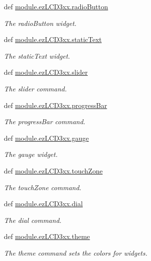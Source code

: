 \begin{DoxyCompactItemize}
def \hyperlink{group___widgets_gaef2c149d7df7f92b718a8660fd0db245}{module.\-ez\-L\-C\-D3xx.\-radio\-Button}
\begin{DoxyCompactList}\small\item\em The radio\-Button widget. \end{DoxyCompactList}\item 
def \hyperlink{group___widgets_gacee37e549f8a877a715b68d39460f7b7}{module.\-ez\-L\-C\-D3xx.\-static\-Text}
\begin{DoxyCompactList}\small\item\em The static\-Text widget. \end{DoxyCompactList}\item 
def \hyperlink{group___widgets_ga93ee96540f5ffc5c4704f60592074d80}{module.\-ez\-L\-C\-D3xx.\-slider}
\begin{DoxyCompactList}\small\item\em The slider command. \end{DoxyCompactList}\item 
def \hyperlink{group___widgets_ga9eeb62ec0060e5ba57e42986b2d555ae}{module.\-ez\-L\-C\-D3xx.\-progress\-Bar}
\begin{DoxyCompactList}\small\item\em The progress\-Bar command. \end{DoxyCompactList}\item 
def \hyperlink{group___widgets_gab71489d4d59dfc595166ed91ff97ed3b}{module.\-ez\-L\-C\-D3xx.\-gauge}
\begin{DoxyCompactList}\small\item\em The gauge widget. \end{DoxyCompactList}\item 
def \hyperlink{group___widgets_gaeb901f189e33956b4cd51fbd78bcf957}{module.\-ez\-L\-C\-D3xx.\-touch\-Zone}
\begin{DoxyCompactList}\small\item\em The touch\-Zone command. \end{DoxyCompactList}\item 
def \hyperlink{group___widgets_ga0122f7d8c41bb07221be8a778ca8fd53}{module.\-ez\-L\-C\-D3xx.\-dial}
\begin{DoxyCompactList}\small\item\em The dial command. \end{DoxyCompactList}\item 
def \hyperlink{group___widgets_ga334488d30595cf0dd9e2742c65558e2c}{module.\-ez\-L\-C\-D3xx.\-theme}
\begin{DoxyCompactList}\small\item\em The theme command sets the colors for widgets. \end{DoxyCompactList}\item 

\end{DoxyCompactItemize}
